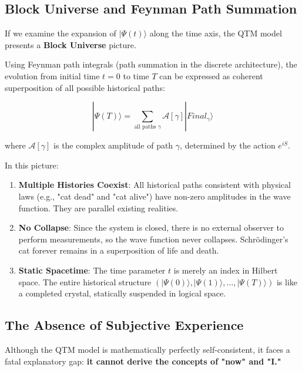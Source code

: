 \subsection{Block Universe and Feynman Path Summation}

If we examine the expansion of $|\Psi(t)\rangle$ along the time axis, the QTM model presents a \textbf{Block Universe} picture.

Using Feynman path integrals (path summation in the discrete architecture), the evolution from initial time $t=0$ to time $T$ can be expressed as coherent superposition of all possible historical paths:

\begin{equation}
|\Psi(T)\rangle = \sum_{\text{all paths } \gamma} \mathcal{A}[\gamma] |Final_\gamma\rangle
\end{equation}

where $\mathcal{A}[\gamma]$ is the complex amplitude of path $\gamma$, determined by the action $e^{iS}$.

In this picture:

\begin{enumerate}
\item \textbf{Multiple Histories Coexist}: All historical paths consistent with physical laws (e.g., "cat dead" and "cat alive") have non-zero amplitudes in the wave function. They are parallel existing realities.

\item \textbf{No Collapse}: Since the system is closed, there is no external observer to perform measurements, so the wave function never collapses. Schrödinger's cat forever remains in a superposition of life and death.

\item \textbf{Static Spacetime}: The time parameter $t$ is merely an index in Hilbert space. The entire historical structure $(|\Psi(0)\rangle, |\Psi(1)\rangle, \dots, |\Psi(T)\rangle)$ is like a completed crystal, statically suspended in logical space.
\end{enumerate}

\subsection{The Absence of Subjective Experience}

Although the QTM model is mathematically perfectly self-consistent, it faces a fatal explanatory gap: \textbf{it cannot derive the concepts of "now" and "I."}

